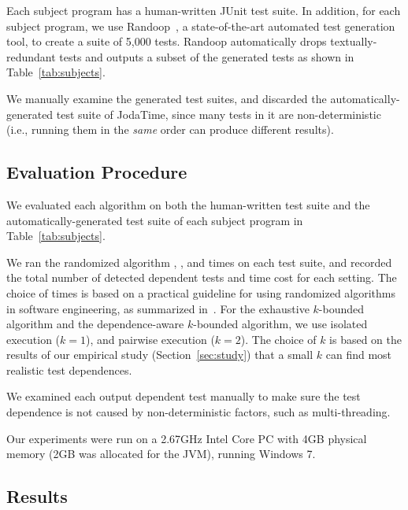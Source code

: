 Each subject program has a human-written JUnit test suite.
In addition, for each subject program, we use
Randoop~\cite{PachecoLET2007}, a state-of-the-art automated
test generation tool, to create a suite of 5,000 tests.
Randoop automatically drops textually-redundant tests 
and outputs a subset of the generated tests as
shown in Table~\ref{tab:subjects}.

We manually examine the generated test suites, and discarded
the automatically-generated test suite of JodaTime, since many
tests in it are non-deterministic (i.e., 
running them in the \textit{same} order can produce different results).


\subsection{Evaluation Procedure}

We evaluated each algorithm 
on both the human-written test suite 
and the automatically-generated test suite
of each subject program in Table~\ref{tab:subjects}.


We ran the randomized algorithm \smalltrialnum, \mediumtrialnum,
and \trialnum times on each test suite, and recorded
the total number of detected dependent tests and time cost
for each setting. The choice of \trialnum times is based
on a practical guideline for using randomized algorithms
in software engineering, as summarized in~\cite{Arcuri:2011}.
%
For the exhaustive $k$-bounded algorithm
and the dependence-aware $k$-bounded algorithm,
we use isolated execution ($k = 1$), and
pairwise execution ($k = 2$). The choice of $k$ is
based on the results of our empirical
study (Section~\ref{sec:study}) that a small $k$
can find most realistic test dependences.


We examined each output dependent test manually to make
sure the test dependence is not caused by non-deterministic
factors, such as multi-threading.

Our experiments were run on a 2.67GHz Intel Core PC
with 4GB physical memory (2GB was allocated for the JVM),
running Windows 7.

\subsection{Results}

